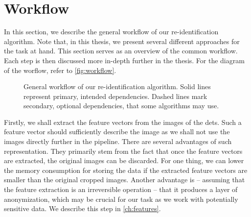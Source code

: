 






\section{Workflow}

\label{sec:workflow}


In this section, we describe the general workflow of our re-identification algorithm. Note that, in this thesis, we present several different approaches for the task at hand. This section serves as an overview of the common workflow. Each step is then discussed more in-depth further in the thesis. For the diagram of the worflow, refer to \autoref{fig:workflow}.

\begin{figure}
    \centering
    \def\svgwidth{\textwidth}
    
    \caption[General workflow of our re-identification algorithm]{General workflow of our re-identification algorithm. Solid lines represent primary, intended dependencies.
    Dashed lines mark secondary, optional dependencies, that some algorithms may use.}
    \label{fig:workflow}
\end{figure}

Firstly, we shall extract the feature vectors from the images of the \glspl{det}. Such a feature vector should sufficiently describe the image as we shall not use the images directly further in the pipeline. There are several advantages of such representation. They primarily stem from the fact that once the feature vectors are extracted, the original images can be discarded. For one thing, we can lower the memory consumption for storing the data if the extracted feature vectors are smaller than the original cropped images. Another advantage is -- assuming that the feature extraction is an irreversible operation -- that it produces a layer of anonymization, which may be crucial for our task as we work with potentially sensitive data. We describe this step in \autoref{ch:features}.

